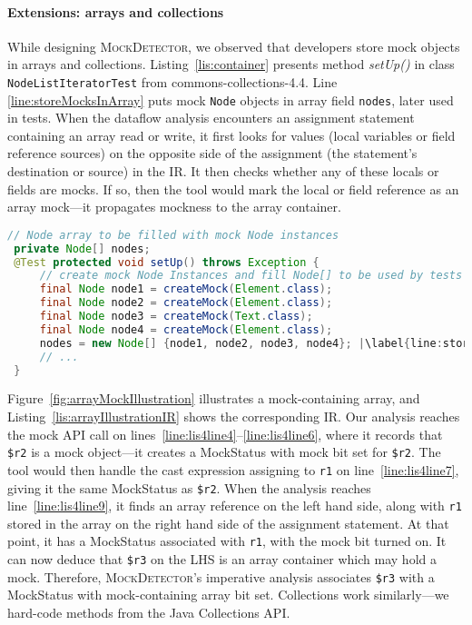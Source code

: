 \paragraph{Extensions: arrays and collections} While designing \textsc{MockDetector}, we observed that developers store mock objects in arrays and collections. Listing~\ref{lis:container} presents method \textit{setUp()} in class \texttt{NodeListIteratorTest} from commons-collections-4.4. Line \ref{line:storeMocksInArray} puts mock \texttt{Node} objects in array field \texttt{nodes}, later used in tests. When the dataflow analysis encounters an assignment statement containing an array read or write, it first looks for values (local variables or field reference sources) on the opposite side of the assignment (the statement's destination or source) in the IR. It then checks whether any of these locals or fields are mocks. If so, then the tool would mark the local or field reference as an array mock---it propagates mockness to the array container.

\begin{lstlisting}[basicstyle=\ttfamily, caption={This example illustrates a field array container holding mock \\ objects from \textit{setUp()} in \texttt{NodeListIteratorTest}.},
basicstyle=\scriptsize\ttfamily,language = Java, framesep=4.5mm, framexleftmargin=1.0mm, captionpos=b, label=lis:container, escapechar=|, morekeywords={@Test}]
 // Node array to be filled with mock Node instances
 private Node[] nodes;
 @Test protected void setUp() throws Exception {
     // create mock Node Instances and fill Node[] to be used by tests
     final Node node1 = createMock(Element.class);
     final Node node2 = createMock(Element.class);
     final Node node3 = createMock(Text.class);
     final Node node4 = createMock(Element.class);
     nodes = new Node[] {node1, node2, node3, node4}; |\label{line:storeMocksInArray}|
     // ...
 }
\end{lstlisting}

Figure~\ref{fig:arrayMockIllustration} illustrates a mock-containing array, and Listing~\ref{lis:arrayIllustrationIR} shows the corresponding IR. Our analysis reaches the mock API call on lines~\ref{line:lis4line4}--\ref{line:lis4line6}, where it records that \texttt{\$r2} is a mock object---it creates a MockStatus with mock bit set for \texttt{\$r2}. The tool would then handle the cast expression assigning to \texttt{r1} on line~\ref{line:lis4line7}, giving it the same MockStatus as \texttt{\$r2}. When the analysis reaches line~\ref{line:lis4line9}, it finds an array reference on the left hand side, along with \texttt{r1} stored in the array on the right hand side of the assignment statement. At that point, it has a MockStatus associated with \texttt{r1}, with the mock bit turned on. It can now deduce that \texttt{\$r3} on the LHS is an array container which may hold a mock. Therefore, \textsc{MockDetector}'s imperative analysis associates \texttt{\$r3} with a MockStatus with mock-containing array bit set. Collections work similarly---we hard-code methods from the Java Collections API.

